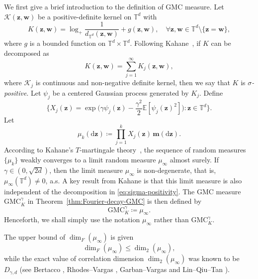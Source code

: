 \documentclass[12pt]{amsart}
\theoremstyle{definition}
\theoremstyle{remark}
\newcommand{\bz}{\boldsymbol{z}}
\newcommand{\bw}{\boldsymbol{w}}
\newcommand{\E}{\mathbb{E}}
\newcommand{\T}{\mathbb{T}}
\newcommand{\GMC}{\mathrm{GMC}}
\numberwithin{equation}{section}
\begin{document}
We first give a brief introduction to the definition of GMC measure. Let $\mathcal{K}(\bz,\bw)$ be a positive-definite kernel on $\T^d$ with
\[
K(\bz,\bw)=\log_+ \frac{1}{d_{\T^d}(\bz,\bw)}+g(\bz,\bw),\quad \forall \bz,\bw\in \T^d\setminus \{\bz=\bw\},
\]
where $g$ is a bounded function on $\T^d\times \T^d$. Following Kahane~\cite{Kah85}, if $K$ can be decomposed as
\begin{equation}\label{eq:sigma-positivity}
K(\bz,\bw)=\sum_{j=1}^\infty K_{j}(\bz,\bw),
\end{equation}
where $\mathcal{K}_j$ is continuous and non-negative definite kernel, then we say that $K$ is \textit{$\sigma$-positive}. Let $\psi_j$ be a centered Gaussian process generated by $K_j$. Define
\begin{equation}\label{eq:def-Xj}
\Big\{X_j(\bz)=\exp\big(\gamma\psi_j(\bz)-\frac{\gamma^2}{2}\E[\psi_j(\bz)^2]\big):\bz\in \T^d\Big\}.
\end{equation}
Let
\[
\mu_k(\mathrm{d}\bz)\coloneq \prod_{j=1}^k X_j(\bz)\,\boldsymbol{m}(\mathrm{d}\bz).
\]
According to Kahane's $T$-martingale theory~\cite{Kah87}, the sequence of random measures $\{\mu_k\}$ weakly converges to a limit random measure $\mu_{\infty}$ almost surely. If $\gamma\in (0,\sqrt{2d})$, then the limit measure $\mu_\infty$ is non-degenerate, that is, $\mu_\infty(\T^d)\ne 0$, a.s. A key result from Kahane is that this limit measure is also independent of the decomposition in \eqref{eq:sigma-positivity}. The GMC measure $\GMC_K^\gamma$ in Theorem~\ref{thm:Fourier-decay-GMC} is then defined by
\[
\GMC_K^\gamma\coloneq \mu_\infty.
\]
Henceforth, we shall simply use the notation $\mu_\infty$ rather than $\GMC_K^\gamma$.

The upper bound of $\dim_F(\mu_\infty)$ is given
\[
\dim_F(\mu_\infty)\le \dim_2(\mu_\infty),
\]
while the exact value of correlation dimension $\dim_2(\mu_\infty)$ was known to be $D_{\gamma,d}$ (see Bertacco \cite[Theorem~3.1 and Formula~(3.2)]{Ber23}, Rhodes--Vargas \cite[Section~4.2]{RV14}, Garban--Vargas \cite[Remark~2]{GV23} and Lin--Qiu--Tan \cite[Lemma~3.6]{LQT25}). 
\end{document}
